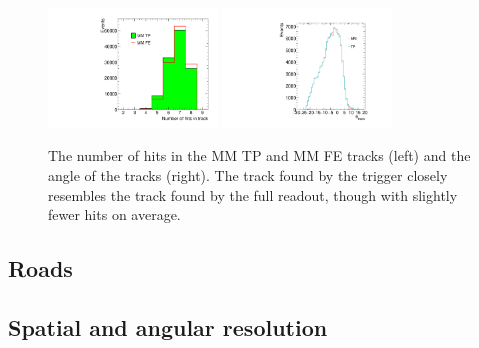 \begin{figure}[!htpb]
  \begin{center}
    \includegraphics[width=0.4\textwidth]{figures/tuna_analysis/trigger_nart.pdf}
    \includegraphics[width=0.4\textwidth]{figures/gbtanalysis3522/ang.pdf}
  \end{center}
  \vspace{-10pt}
  \caption{The number of hits in the MM TP and MM FE tracks (left) and the angle of the tracks (right). The track found by the trigger closely resembles the track found by the full readout, though with slightly fewer hits on average.}
  \label{fig:tp_vs_fe}
\end{figure}

\subsection{Roads}
\label{sec:perf-roads}

\subsection{Spatial and angular resolution}
\label{sec:perf-res}

